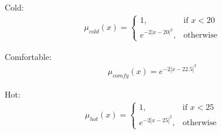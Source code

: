 \documentclass{article}
\begin{document}
Cold:
\begin{align*}
	\mu_{cold}(x) =
	\begin{cases}
		1, & \text{if } x < 20\\
		e^{-2|x-20|^2}, & \text{otherwise}
	\end{cases}
\end{align*}

Comfortable:
\begin{align*}
	\mu_{comfy}(x) = e^{-2|x-22.5|^3}
\end{align*}

Hot:
\begin{align*}
	\mu_{hot}(x) =
	\begin{cases}
		1, & \text{if } x < 25\\
		e^{-2|x-25|^2}, & \text{otherwise}
	\end{cases}
\end{align*}
\end{document}

